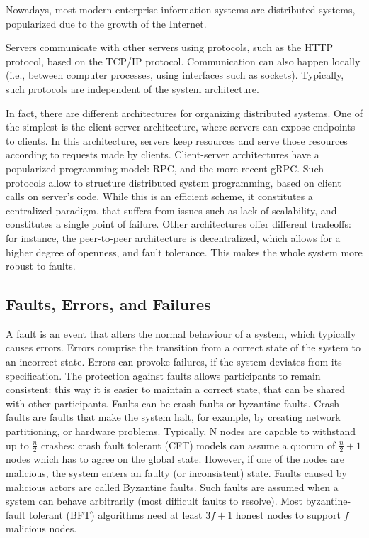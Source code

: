 \documentclass[12pt,a4paper]{article}
\begin{document}
Nowadays, most modern enterprise information systems are distributed systems, popularized due to the growth of the Internet.


Servers communicate with other servers using protocols, such as the HTTP protocol, based on the TCP/IP protocol. Communication can also happen locally (i.e., between computer processes, using interfaces such as sockets). Typically, such protocols are independent of the system architecture.

In fact, there are different architectures for organizing distributed systems. One of the simplest is the client-server architecture, where servers can expose endpoints to clients.
In this architecture, servers keep resources and serve those resources according to requests made by clients. Client-server architectures have a popularized programming model: RPC, and the more recent gRPC. Such protocols allow to structure distributed system programming, based on client calls on server's code. While this is an efficient scheme, it constitutes a centralized paradigm, that suffers from issues such as lack of scalability, and constitutes a single point of failure. Other architectures offer different tradeoffs: for instance, the peer-to-peer architecture is decentralized, which allows for a higher degree of openness, and fault tolerance. This makes the whole system more robust to faults. 

\subsection{Faults, Errors, and Failures}
A fault is an event that alters the normal behaviour of a system, which typically causes errors. Errors comprise the transition from a correct state of the system to an incorrect state. Errors can provoke failures, if the system deviates from its specification. The protection against faults allows participants to remain consistent: this way it is easier to maintain a correct state, that can be shared with other participants. Faults can be crash faults or byzantine faults. Crash faults are faults that make the system halt, for example, by creating network partitioning, or hardware problems. Typically, N nodes are capable to withstand up to $\frac{n}{2}$ crashes: crash fault tolerant (CFT) models can assume a quorum of $\frac{n}{2}+1$ nodes which has to agree on the global state. However, if one of the nodes are malicious, the system enters an faulty (or inconsistent) state. Faults caused by malicious actors are called Byzantine faults. Such faults are assumed when a system can behave arbitrarily (most difficult faults to resolve). Most byzantine-fault tolerant (BFT) algorithms need at least $3f+1$ honest nodes to support $f$ malicious nodes.
\end{document}
